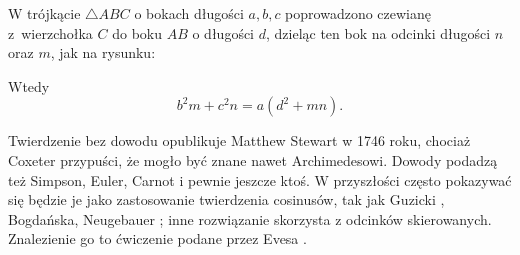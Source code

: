 \begin{theorem}[Stewarta, 1746]
	W trójkącie $\triangle ABC$ o bokach długości $a, b, c$ poprowadzono czewianę z~wierzchołka $C$ do boku $AB$ o długości $d$, dzieląc ten bok na odcinki długości $n$ oraz $m$, jak na rysunku:
	\begin{center}
\begin{comment}
    \begin{tikzpicture}[scale=.4]
        \tkzDefPoint(0, 0){A}
		\tkzDefPoint(3.25, 3.25){d}

		\tkzDefPoint(6, 0){AB}
        \tkzDefPoint(10, 0){B}
        \tkzDefPoint(1, 7){C}
        \tkzDefPoint(35:4.75){CC}
		\tkzDrawSegments(C,AB)
        \tkzDrawPolygon[line width=0.3mm](A,B,C)

        \tkzLabelPoint[below left](A){$A$}
        \tkzLabelPoint[below right](B){$B$}
        \tkzLabelPoint[above](C){$C$}

        \tkzLabelPoint(d){$d$}

		\tkzDrawPoints[size=3,color=black,fill=black!80](A,B,C,AB)
		\tkzDrawSegment[dim={$\,\,c\,\,$,-16pt,transform shape}](A,B)
		\tkzDrawSegment[dim={$\,\,n\,\,$,-8pt,transform shape}](A,AB)
		\tkzDrawSegment[dim={$\,\,m\,\,$,-8pt,transform shape}](AB,B)
		\tkzDrawSegment[dim={$\,\,b\,\,$,8pt,transform shape,sloped}](A,C)
		\tkzDrawSegment[dim={$\,\,a\,\,$,-8pt,transform shape,sloped}](B,C)
    \end{tikzpicture}
\end{comment}
    \end{center}
	Wtedy
	\begin{equation}
		b^2 m + c^2 n = a (d^2 + mn).
	\end{equation}
\end{theorem}

Twierdzenie bez dowodu opublikuje Matthew Stewart w 1746 roku, chociaż Coxeter przypuści, że mogło być znane nawet Archimedesowi.
%
%
Dowody podadzą też Simpson, Euler, Carnot i pewnie jeszcze ktoś.
%
%
%
W przyszłości często pokazywać się będzie je jako zastosowanie twierdzenia cosinusów, tak jak Guzicki \cite[s. 265]{guzicki_2021}, Bogdańska, Neugebauer \cite[s. 90-91]{neugebauer_2018}; inne rozwiązanie skorzysta z odcinków skierowanych.
Znalezienie go to ćwiczenie podane przez Evesa \cite[s. 58]{eves1_1972}.

